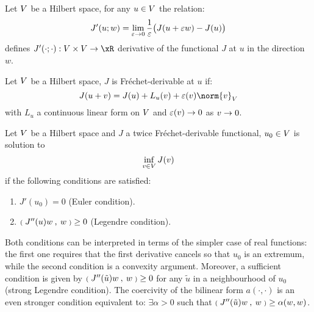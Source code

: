 \begin{dfntn}
Let ${V}$ be a Hilbert space, for any $u\in{V}$ the relation:
\begin{equation}\label{eq:directional_derivative}
J'(u; w) = \lim_{\varepsilon\rightarrow 0} \displaystyle \frac{1}{\varepsilon}\bigr( J(u + \varepsilon w) - J(u) \bigl)
\end{equation}
defines $J'(\cdot; \cdot): \xV\times\xV \rightarrow\xR$ derivative of the functional $J$ at $u$ in the direction $w$.
\end{dfntn}

\begin{dfntn}
Let ${V}$ be a Hilbert space, $J$ is Fréchet-derivable at $u$ if:
\begin{equation}\label{eq:frechet_derivative}
J(u + v) =  J(u) + L_u(v) + \varepsilon(v) \norm{v}_\xV
\end{equation}
with $L_u$ a continuous linear form on ${V}$ and $\varepsilon(v)\rightarrow 0$ as $v \rightarrow 0$.
\end{dfntn}

\begin{prpstn}
Let ${V}$ be a Hilbert space and $J$ a twice Fréchet-derivable functional, $u_0 \in{V}$ is solution to
\begin{equation}\label{eq:minimization}
\inf_{v\in{V}} J(v)
\end{equation}
if the following conditions are satisfied:
\begin{enumerate}
\item $J'(u_0) = 0$ (Euler condition).
\item ${{\scriptstyle\mathbf{(}}\;J''(u)w\:,\: w \;{\scriptstyle\mathbf{)}}} \geq 0$ (Legendre condition).
\end{enumerate}
\end{prpstn}

Both conditions can be interpreted in terms of the simpler case of real functions: the first one requires that the first derivative cancels so that $u_0$ is an extremum, while the second condition is a convexity argument.
Moreover, a sufficient condition is given by ${{\scriptstyle\mathbf{(}}\;J''(\tilde u)w\:,\: w \;{\scriptstyle\mathbf{)}}} \geq 0$ for any $\tilde u$ in a neighbourhood of $u_0$ (strong Legendre condition).
The coercivity of the bilinear form $a(\cdot, \cdot)$ is an even stronger condition equivalent to: $\exists \alpha > 0$ such that ${{\scriptstyle\mathbf{(}}\;J''(\tilde u)w\:,\: w \;{\scriptstyle\mathbf{)}}} \geq \alpha (w,w)$.

